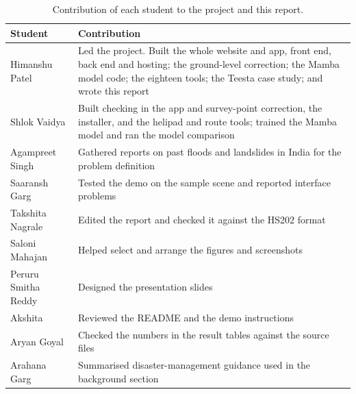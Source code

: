 \documentclass[11pt,a4paper]{article}
\begin{document}
\begin{table}[H]
\centering\small
\caption{Contribution of each student to the project and this report.}
\label{tab:contrib}
\begin{tabularx}{\linewidth}{@{}>{\raggedright\arraybackslash}p{3.1cm}Y@{}}
\toprule
Student & Contribution \\
\midrule
Himanshu Patel & Led the project. Built the whole website and app, front end, back end and hosting; the ground-level correction; the Mamba model code; the eighteen tools; the Teesta case study; and wrote this report \\
Shlok Vaidya & Built checking in the app and survey-point correction, the installer, and the helipad and route tools; trained the Mamba model and ran the model comparison \\
\addlinespace
Agampreet Singh & Gathered reports on past floods and landslides in India for the problem definition \\
Saaransh Garg & Tested the demo on the sample scene and reported interface problems \\
Takshita Nagrale & Edited the report and checked it against the HS202 format \\
Saloni Mahajan & Helped select and arrange the figures and screenshots \\
Peruru Smitha Reddy & Designed the presentation slides \\
Akshita & Reviewed the README and the demo instructions \\
Aryan Goyal & Checked the numbers in the result tables against the source files \\
Arahana Garg & Summarised disaster-management guidance used in the background section \\
\bottomrule
\end{tabularx}
\end{table}
\end{document}
